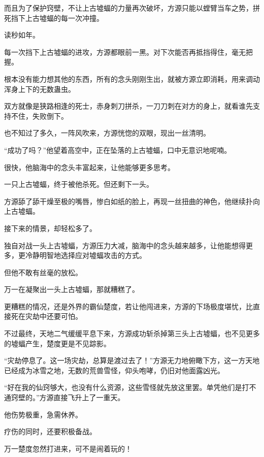 \begin{this_body}
而且为了保护窍壁，不让上古墟蝠的力量再次破坏，方源只能以螳臂当车之势，拼死挡下上古墟蝠的每一次冲撞。

读秒如年。

每一次挡下上古墟蝠的进攻，方源都眼前一黑。对下次能否再抵挡得住，毫无把握。

根本没有能力想其他的东西，所有的念头刚刚生出，就被方源立即消耗，用来调动浑身上下的无数蛊虫。

双方就像是狭路相逢的死士，赤身刺刀拼杀，一刀刀刺在对方的身上，就看谁先支持不住，失败倒下。

也不知过了多久，一阵风吹来，方源恍惚的双眼，现出一丝清明。

“成功了吗？”他望着高空中，正在坠落的上古墟蝠，口中无意识地呢喃。

很快，他脑海中的念头丰富起来，让他能够更多思考。

一只上古墟蝠，终于被他杀死。但还剩下一头。

方源舔了舔干燥至极的嘴唇，惨白如纸的脸上，再现一丝扭曲的神色，他继续扑向上古墟蝠。

接下来的情景，却轻松多了。

独自对战一头上古墟蝠，方源压力大减，脑海中的念头越来越多，让他能想得更多，更冷静明智地选择应对墟蝠攻击的方式。

但他不敢有丝毫的放松。

万一在凝聚出一头上古墟蝠，那就糟糕了。

更糟糕的情况，还是外界的霸仙楚度，若让他闯进来，方源的下场极度堪忧，比直接死在灾劫中还要可怕。

不过最终，天地二气缓缓平息下来，方源成功斩杀掉第三头上古墟蝠，也不见更多的墟蝠产生，楚度更是不见踪影。

“灾劫停息了。这一场灾劫，总算是渡过去了！”方源无力地俯瞰下方，这一方天地已经成为冰雪之地，无数的荒兽雪怪，仰头咆哮，仍旧对他面露凶光。

“好在我的仙窍够大，也没有什么资源，这些雪怪就先放这里罢。单凭他们是打不通窍壁的。”方源直接飞升上了一重天。

他伤势极重，急需休养。

疗伤的同时，还要积极备战。

万一楚度忽然打进来，可不是闹着玩的！

\end{this_body}

